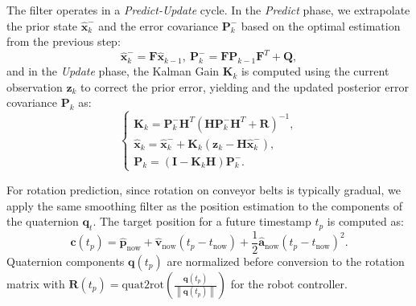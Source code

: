 The filter operates in a \textit{Predict-Update} cycle.  In the \textit{Predict} phase, we extrapolate the prior state $\hat{\boldsymbol{x}}_{k}^{-}$ and the error covariance $\boldsymbol{P}_{k}^{-}$ based on the optimal estimation  from the previous step:
\begin{equation}
\hat{\boldsymbol{x}}_{k}^{-}=\boldsymbol{F}\hat{\boldsymbol{x}}_{k-1},\
\boldsymbol{P}_{k}^{-}=\boldsymbol{F}\boldsymbol{P}_{k-1}\boldsymbol{F}^{T}+\boldsymbol{Q},
\label{eq:kf_predict}
\end{equation}
and in the \textit{Update} phase, the Kalman Gain $\boldsymbol{K}_{k}$ is computed using the current observation $\boldsymbol{z}_k$ to correct the prior error, yielding  and the updated posterior error covariance $\boldsymbol{P}_{k}$ as:
\begin{equation}
\begin{cases}
    \boldsymbol{K}_{k}=\boldsymbol{P}_{k}^{-}\boldsymbol{H}^{T}(\boldsymbol{H}\boldsymbol{P}_{k}^{-}\boldsymbol{H}^{T}+\boldsymbol{R})^{-1}, \\
\hat{\boldsymbol{x}}_{k}=\hat{\boldsymbol{x}}_{k}^{-}+\boldsymbol{K}_{k}(\boldsymbol{z}_{k}-\boldsymbol{H}\hat{\boldsymbol{x}}_{k}^{-}), \\
\boldsymbol{P}_{k}=(\boldsymbol{I}-\boldsymbol{K}_{k}\boldsymbol{H})\boldsymbol{P}_{k}^{-}.
\end{cases}
\end{equation}

For rotation prediction, since rotation on conveyor belts is typically gradual, we apply the same smoothing filter as the position estimation to the components of the quaternion $\boldsymbol{q}_t$. The target position for a future timestamp $t_p$ is computed as:
\begin{equation}
\boldsymbol{c}(t_p)=\hat{\boldsymbol{p}}_{\text{now}}+\hat{\boldsymbol{v}}_{\text{now}}(t_p-t_{\text{now}})+\frac{1}{2}\hat{\boldsymbol{a}}_{\text{now}}(t_p-t_{\text{now}})^2.
\end{equation}
Quaternion components $\boldsymbol{q}(t_p)$ are normalized before conversion to the rotation matrix with $\boldsymbol{R}(t_p) = \mathrm{quat2rot}(\frac{\boldsymbol{q}(t_p)}{\left \| \boldsymbol{q}(t_p) \right \| })$ for the robot controller. 

